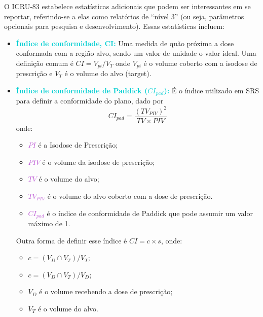 \documentclass[11pt,a4paper]{article}
\begin{document}
	O ICRU-83 estabelece estatísticas adicionais que podem ser interessantes em se reportar, referindo-se a elas como relatórios de “nível 3” (ou seja, parâmetros opcionais para pesquisa e desenvolvimento). Essas estatísticas incluem:

	\begin{itemize}[label=\textcolor{CarnationPink}{$\blacktriangleright$}]
		\item \textcolor{DarkTurquoise}{\textbf{Índice de conformidade, CI:}} Uma medida de quão próxima a dose conformada com a região alvo, sendo um valor de unidade o valor ideal. Uma definição comum é $CI = V_{pi}/V_{T}$ onde $V_{pi}$ é o volume coberto com a isodose de prescrição e $V_{T}$ é o volume do alvo (target).
		\item \textcolor{DarkTurquoise}{\textbf{Índice de conformidade de Paddick ($CI_{pad}$):}} É o índice utilizado em SRS para definir a conformidade do plano, dado por $$CI_{pad} = \frac{(TV_{PIV})^2}{TV \times PIV}$$ onde:
			\begin{itemize}[label=\textcolor{CarnationPink}{$\star$}]
				\item \textcolor{MediumOrchid}{$PI$} é a Isodose de Prescrição;
				\item \textcolor{MediumOrchid}{$PIV$} é o volume da isodose de prescrição;
				\item \textcolor{MediumOrchid}{$TV$} é o volume do alvo;
				\item \textcolor{MediumOrchid}{$TV_{PIV}$} é o volume do alvo coberto com a dose de prescrição.
				\item \textcolor{MediumOrchid}{$CI_{pad}$} é o índice de conformidade de Paddick que pode assumir um valor máximo de 1. 
			\end{itemize}
		
		Outra forma de definir esse índice é $CI = c \times s$, onde:
			\begin{itemize}[label=\textcolor{CarnationPink}{$\star$}]
				\item $c = (V_D \cap V_T) / V_T$;
				\item $c = (V_D \cap V_T) / V_D$;
				\item $V_D$ é o volume recebendo a dose de prescrição;
				\item $V_T$ é o volume do alvo.
			\end{itemize}


\end{itemize}
\end{document}
